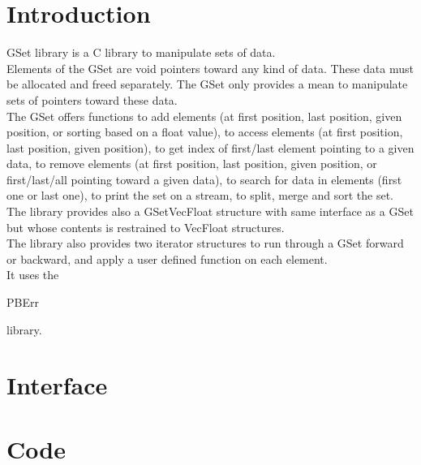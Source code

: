 \section*{Introduction}

GSet library is a C library to manipulate sets of data.\\

Elements of the GSet are void pointers toward any kind of data. These data must be allocated and freed separately. The GSet only provides a mean to manipulate sets of pointers toward these data.\\

The GSet offers functions to add elements (at first position, last position, given position, or sorting based on a float value), to access elements (at first position, last position, given position), to get index of first/last element pointing to a given data, to remove elements (at first position, last position, given position, or first/last/all pointing toward a given data), to search for data in elements (first one or last one), to print the set on a stream, to split, merge and sort the set.\\

The library provides also a GSetVecFloat structure with same interface as a GSet but whose contents is restrained to VecFloat structures.\\

The library also provides two iterator structures to run through a GSet forward or backward, and apply a user defined function on each element.\\ 

It uses the \begin{ttfamily}PBErr\end{ttfamily} library.\\

\section{Interface}

\begin{scriptsize}
\begin{ttfamily}

\end{ttfamily}
\end{scriptsize}

\section{Code}

